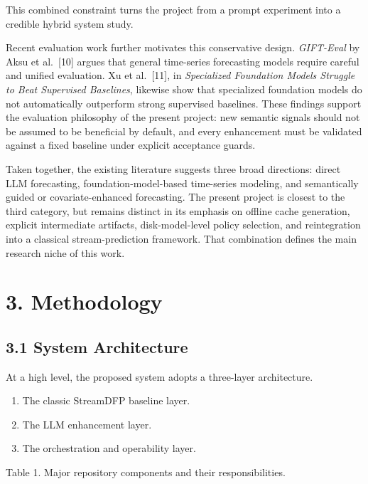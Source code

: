 \documentclass[
  11pt,
  a4paper]{article}
\providecommand{\tightlist}{%
  \setlength{\itemsep}{0pt}\setlength{\parskip}{0pt}}
\begin{document}
This combined constraint turns the project from a prompt experiment into
a credible hybrid system study.

Recent evaluation work further motivates this conservative design.
\emph{GIFT-Eval} by Aksu et al.~{[}10{]} argues that general time-series
forecasting models require careful and unified evaluation. Xu et
al.~{[}11{]}, in \emph{Specialized Foundation Models Struggle to Beat
Supervised Baselines}, likewise show that specialized foundation models
do not automatically outperform strong supervised baselines. These
findings support the evaluation philosophy of the present project: new
semantic signals should not be assumed to be beneficial by default, and
every enhancement must be validated against a fixed baseline under
explicit acceptance guards.

Taken together, the existing literature suggests three broad directions:
direct LLM forecasting, foundation-model-based time-series modeling, and
semantically guided or covariate-enhanced forecasting. The present
project is closest to the third category, but remains distinct in its
emphasis on offline cache generation, explicit intermediate artifacts,
disk-model-level policy selection, and reintegration into a classical
stream-prediction framework. That combination defines the main research
niche of this work.

\hypertarget{methodology}{%
\section{3. Methodology}\label{methodology}}

\hypertarget{system-architecture}{%
\subsection{3.1 System Architecture}\label{system-architecture}}

At a high level, the proposed system adopts a three-layer architecture.

\begin{enumerate}
\def\labelenumi{\arabic{enumi}.}
\tightlist
\item
  The classic StreamDFP baseline layer.
\item
  The LLM enhancement layer.
\item
  The orchestration and operability layer.
\end{enumerate}

Table 1. Major repository components and their responsibilities.
\end{document}
